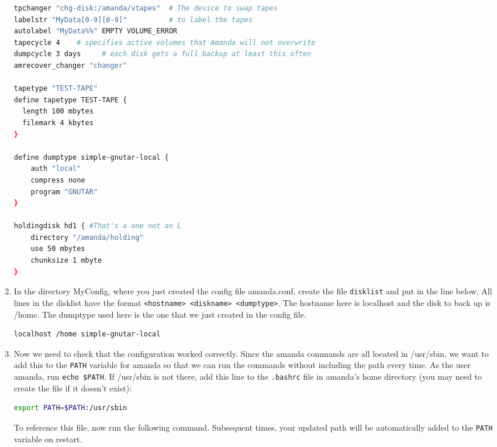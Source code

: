 \documentclass{article}
\begin{document}
\begin{enumerate}
\begin{lstlisting}[basicstyle=\ttfamily, backgroundcolor = \color{lightgray}, language = bash, xleftmargin = 0cm, framexleftmargin = 1em]
tpchanger "chg-disk:/amanda/vtapes"  # The device to swap tapes
labelstr "MyData[0-9][0-9]"          # to label the tapes
autolabel "MyData%%" EMPTY VOLUME_ERROR
tapecycle 4    # specifies active volumes that Amanda will not overwrite
dumpcycle 3 days     # each disk gets a full backup at least this often
amrecover_changer "changer"

tapetype "TEST-TAPE"
define tapetype TEST-TAPE {
  length 100 mbytes
  filemark 4 kbytes
}

define dumptype simple-gnutar-local {
    auth "local"
    compress none
    program "GNUTAR"
}

holdingdisk hd1 { #That's a one not an L
    directory "/amanda/holding"
    use 50 mbytes
    chunksize 1 mbyte
} 
\end{lstlisting}

\item In the directory MyConfig, where you just created the config file amanda.conf, create the file \verb|disklist| and put in the line below. All lines in the disklist have the format \verb|<hostname> <diskname> <dumptype>|. The hostname here is localhost and the disk to back up is /home. The dumptype used here is the one that we just created in the config file.

\begin{lstlisting}[basicstyle=\ttfamily, backgroundcolor = \color{lightgray}, language = bash, xleftmargin = 0cm, framexleftmargin = 1em]
localhost /home simple-gnutar-local
\end{lstlisting}

\item Now we need to check that the configuration worked correctly. Since the amanda commands are all located in /usr/sbin, we want to add this to the \verb|PATH| variable for amanda so that we can run the commands without including the path every time. As the user amanda, run \verb|echo $PATH|. If /usr/sbin is not there, add this line to the \verb|.bashrc| file in amanda's home directory (you may need to create the file if it doesn't exist):

\begin{lstlisting}[basicstyle=\ttfamily, backgroundcolor = \color{lightgray}, language = bash, xleftmargin = 0cm, framexleftmargin = 1em]
export PATH=$PATH:/usr/sbin
\end{lstlisting}

To reference this file, now run the following command. Subsequent times, your updated path will be automatically added to the \verb|PATH| variable on restart.


\end{enumerate}
\end{document}
